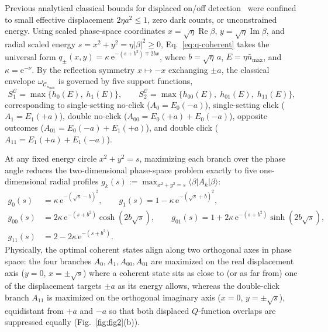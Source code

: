 \documentclass{iopjournal}
\newcommand{\RePart}{\operatorname{Re}}
\newcommand{\ImPart}{\operatorname{Im}}
\newcommand{\Cset}{\mathcal{C}}
\newcommand{\nbar}{\bar n_{\max}}
\newcommand{\ket}[1]{\lvert #1\rangle}
\newcommand{\bra}[1]{\langle #1\rvert}
\newcommand{\abs}[1]{\lvert #1\rvert}
\newcommand{\ee}{\mathrm{e}}
\begin{document}
Previous analytical classical bounds for displaced on/off detection~\cite{Kovtoniuk2024} were confined to small effective displacement $2\eta a^2 \le 1$, zero dark counts, or unconstrained energy. Using scaled phase-space coordinates $x = \sqrt{\eta}\RePart\beta$, $y = \sqrt{\eta}\ImPart\beta$, and radial scaled energy $s = x^2 + y^2 = \eta\abs{\beta}^2 \ge 0$, Eq.~\eqref{eq:q-coherent} takes the universal form $q_\pm(x,y) = \kappa\,\ee^{-(s+b^2)\mp 2bx}$, where $b = \sqrt{\eta}\,a$, $E = \eta\nbar$, and $\kappa = \ee^{-\nu}$. By the reflection symmetry $x \mapsto -x$ exchanging $\pm a$, the classical envelope $\omega_{\Cset_{\nbar}}$ is governed by five support functions,
\begin{equation}\label{eq:five-supports}
S_1^{\Cset} = \max\bigl\{h_0(E),\; h_1(E)\bigr\}, \qquad S_2^{\Cset} = \max\bigl\{h_{00}(E),\; h_{01}(E),\; h_{11}(E)\bigr\},
\end{equation}
corresponding to single-setting no-click ($A_0 = E_0(-a)$), single-setting click ($A_1 = E_1(+a)$), double no-click ($A_{00} = E_0(+a)+E_0(-a)$), opposite outcomes ($A_{01} = E_0(-a)+E_1(+a)$), and double click ($A_{11} = E_1(+a)+E_1(-a)$).

At any fixed energy circle $x^2 + y^2 = s$, maximizing each branch over the phase angle reduces the two-dimensional phase-space problem exactly to five one-dimensional radial profiles $g_k(s) := \max_{x^2+y^2=s}\bra{\beta}A_k\ket{\beta}$:
\begin{align}
g_0(s) &= \kappa\,\ee^{-(\sqrt{s}-b)^2}, \qquad
g_1(s) = 1 - \kappa\,\ee^{-(\sqrt{s}+b)^2}, \label{eq:g0-g1}\\
g_{00}(s) &= 2\kappa\,\ee^{-(s+b^2)}\cosh(2b\sqrt{s}), \qquad
g_{01}(s) = 1 + 2\kappa\,\ee^{-(s+b^2)}\sinh(2b\sqrt{s}), \label{eq:g00-g01}\\
g_{11}(s) &= 2 - 2\kappa\,\ee^{-(s+b^2)}. \label{eq:g11}
\end{align}
Physically, the optimal coherent states align along two orthogonal axes in phase space: the four branches $A_0, A_1, A_{00}, A_{01}$ are maximized on the real displacement axis ($y = 0$, $x = \pm\sqrt{s}$) where a coherent state sits as close to (or as far from) one of the displacement targets $\pm a$ as its energy allows, whereas the double-click branch $A_{11}$ is maximized on the orthogonal imaginary axis ($x = 0$, $y = \pm\sqrt{s}$), equidistant from $+a$ and $-a$ so that both displaced $Q$-function overlaps are suppressed equally (Fig.~\ref{fig:fig2}(b)).
\end{document}
